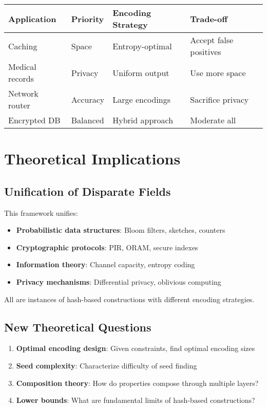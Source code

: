 \documentclass[11pt,final,hidelinks]{article}
\begin{document}
\begin{center}
\begin{tabular}{llll}
\toprule
\textbf{Application} & \textbf{Priority} & \textbf{Encoding Strategy} & \textbf{Trade-off} \\
\midrule
Caching & Space & Entropy-optimal & Accept false positives \\
Medical records & Privacy & Uniform output & Use more space \\
Network router & Accuracy & Large encodings & Sacrifice privacy \\
Encrypted DB & Balanced & Hybrid approach & Moderate all \\
\bottomrule
\end{tabular}
\end{center}

\section{Theoretical Implications}

\subsection{Unification of Disparate Fields}

This framework unifies:
\begin{itemize}
    \item \textbf{Probabilistic data structures}: Bloom filters, sketches, counters
    \item \textbf{Cryptographic protocols}: PIR, ORAM, secure indexes
    \item \textbf{Information theory}: Channel capacity, entropy coding
    \item \textbf{Privacy mechanisms}: Differential privacy, oblivious computing
\end{itemize}

All are instances of hash-based constructions with different encoding strategies.

\subsection{New Theoretical Questions}

\begin{enumerate}
    \item \textbf{Optimal encoding design}: Given constraints, find optimal encoding sizes
    \item \textbf{Seed complexity}: Characterize difficulty of seed finding
    \item \textbf{Composition theory}: How do properties compose through multiple layers?
    \item \textbf{Lower bounds}: What are fundamental limits of hash-based constructions?
\end{enumerate}
\end{document}
